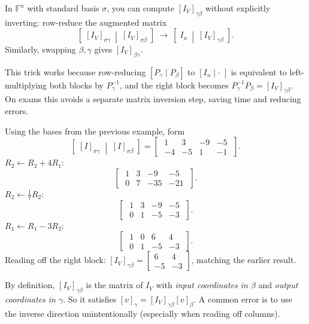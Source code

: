 \begin{examtip}[title={Exam Focus: fast row-reduction trick for $[I_V]_{\gamma\beta}$}]
In $\mathbb{F}^n$ with standard basis $\sigma$, you can compute $[I_V]_{\gamma\beta}$ without explicitly inverting:
row-reduce the augmented matrix
\[
\left[\; [I_V]_{\sigma\gamma}\ \middle|\ [I_V]_{\sigma\beta}\;\right]
\ \longrightarrow\
\left[\; I_n\ \middle|\ [I_V]_{\gamma\beta}\;\right].
\]
Similarly, swapping $\beta,\gamma$ gives $[I_V]_{\beta\gamma}$.
\end{examtip}

This trick works because row-reducing $[P_\gamma \mid P_\beta]$ to $[I_n \mid \cdot\;]$ is equivalent to left-multiplying both blocks by $P_\gamma^{-1}$, and the right block becomes $P_\gamma^{-1}P_\beta = [I_V]_{\gamma\beta}$.
On exams this avoids a separate matrix inversion step, saving time and reducing errors.

\begin{examplebox}[title={Worked micro-example: row-reduction approach in $\mathbb{R}^2$}]
Using the bases from the previous example, form
\[
\left[\;[I]_{\sigma\gamma}\;\middle|\;[I]_{\sigma\beta}\;\right]
=
\left[\;\begin{array}{rr|rr}
1 & 3 & -9 & -5\\
-4 & -5 & 1 & -1
\end{array}\;\right].
\]
$R_2\leftarrow R_2+4R_1$:
\[
\left[\;\begin{array}{rr|rr}
1 & 3 & -9 & -5\\
0 & 7 & -35 & -21
\end{array}\;\right].
\]
$R_2\leftarrow \tfrac17 R_2$:
\[
\left[\;\begin{array}{rr|rr}
1 & 3 & -9 & -5\\
0 & 1 & -5 & -3
\end{array}\;\right].
\]
$R_1\leftarrow R_1-3R_2$:
\[
\left[\;\begin{array}{rr|rr}
1 & 0 & 6 & 4\\
0 & 1 & -5 & -3
\end{array}\;\right].
\]
Reading off the right block: $[I_V]_{\gamma\beta}=\begin{bmatrix}6&4\\-5&-3\end{bmatrix}$, matching the earlier result.
\end{examplebox}

\begin{commonmistake}[title={Common Mistake: "from $\beta$ to $\gamma$" direction error}]
By definition, $[I_V]_{\gamma\beta}$ is the matrix of $I_V$ with \emph{input coordinates in $\beta$} and \emph{output coordinates in $\gamma$}.
So it satisfies $[v]_\gamma=[I_V]_{\gamma\beta}[v]_\beta$.
A common error is to use the inverse direction unintentionally (especially when reading off columns).
\end{commonmistake}

